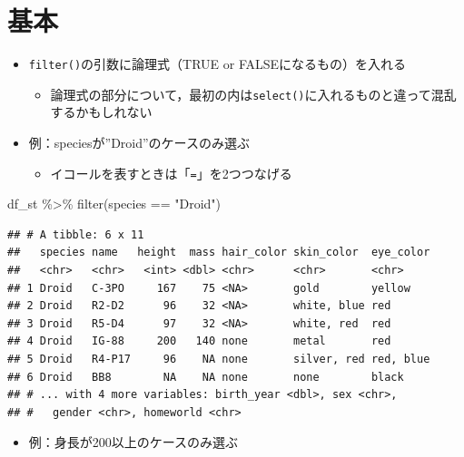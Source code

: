 \documentclass[
  xelatex,ja=standard, b5paper]{bxjsbook}
\newenvironment{Shaded}{\begin{snugshade}}{\end{snugshade}}
\newcommand{\FunctionTok}[1]{\textcolor[rgb]{0.00,0.00,0.00}{#1}}
\newcommand{\NormalTok}[1]{#1}
\newcommand{\SpecialCharTok}[1]{\textcolor[rgb]{0.00,0.00,0.00}{#1}}
\newcommand{\StringTok}[1]{\textcolor[rgb]{0.31,0.60,0.02}{#1}}
\providecommand{\tightlist}{%
  \setlength{\itemsep}{0pt}\setlength{\parskip}{0pt}}
\begin{document}
\hypertarget{filter-st}{%
\section{基本}\label{filter-st}}

\begin{itemize}
\tightlist
\item
  \texttt{filter()}の引数に論理式（TRUE or FALSEになるもの）を入れる

  \begin{itemize}
  \tightlist
  \item
    論理式の部分について，最初の内は\texttt{select()}に入れるものと違って混乱するかもしれない
  \end{itemize}
\item
  例：speciesが''Droid''のケースのみ選ぶ

  \begin{itemize}
  \tightlist
  \item
    イコールを表すときは「\texttt{=}」を2つつなげる
  \end{itemize}
\end{itemize}

\begin{Shaded}
\begin{Highlighting}[]
\NormalTok{df\_st }\SpecialCharTok{\%\textgreater{}\%} 
  \FunctionTok{filter}\NormalTok{(species }\SpecialCharTok{==} \StringTok{"Droid"}\NormalTok{)}
\end{Highlighting}
\end{Shaded}

\begin{verbatim}
## # A tibble: 6 x 11
##   species name   height  mass hair_color skin_color  eye_color
##   <chr>   <chr>   <int> <dbl> <chr>      <chr>       <chr>    
## 1 Droid   C-3PO     167    75 <NA>       gold        yellow   
## 2 Droid   R2-D2      96    32 <NA>       white, blue red      
## 3 Droid   R5-D4      97    32 <NA>       white, red  red      
## 4 Droid   IG-88     200   140 none       metal       red      
## 5 Droid   R4-P17     96    NA none       silver, red red, blue
## 6 Droid   BB8        NA    NA none       none        black    
## # ... with 4 more variables: birth_year <dbl>, sex <chr>,
## #   gender <chr>, homeworld <chr>
\end{verbatim}

\begin{itemize}
\tightlist
\item
  例：身長が200以上のケースのみ選ぶ
\end{itemize}
\end{document}
